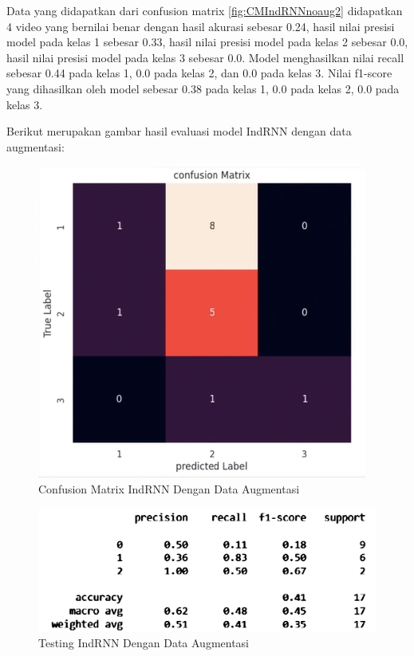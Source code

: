 Data yang didapatkan dari confusion matrix \ref{fig:CMIndRNNnoaug2} didapatkan 4 video yang bernilai benar
dengan hasil akurasi sebesar 0.24, hasil nilai presisi model pada kelas 1 sebesar 0.33, hasil nilai
presisi model pada kelas 2 sebesar 0.0, hasil nilai presisi model pada kelas 3 sebesar 0.0. Model menghasilkan
nilai recall sebesar 0.44 pada kelas 1, 0.0 pada kelas 2, dan 0.0 pada kelas 3. Nilai f1-score yang dihasilkan
oleh model sebesar 0.38 pada kelas 1, 0.0 pada kelas 2, 0.0 pada kelas 3.

Berikut merupakan gambar hasil evaluasi model IndRNN  dengan data augmentasi:
\newpage
\begin{figure} [ht] \centering
  \includegraphics[scale=1.3]{gambar/CMIndRNNaug2.png}
  \caption{Confusion Matrix IndRNN Dengan Data Augmentasi}
  \label{fig:CMIndRNNaug2}
\end{figure}

\begin{figure} [ht] \centering
  \includegraphics[scale=0.55]{gambar/scoreIndRNNaug2.png}
  \caption{Testing IndRNN Dengan Data Augmentasi}
  \label{fig:ScoreIndRNNaug}
\end{figure}

